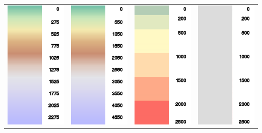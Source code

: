 \begin{longtable}{c c c c}
\includegraphics[angle=0,width=3.0cm,keepaspectratio='true']{figures/ramp-terrain-flatlands.png}&
\includegraphics[angle=0,width=3.0cm,keepaspectratio='true']{figures/ramp-terrain-mountanous.png}&
\includegraphics[angle=0,width=3.0cm,keepaspectratio='true']{figures/ramp-terrain-icao.png}&
\includegraphics[angle=0,width=3.0cm,keepaspectratio='true']{figures/ramp-terrain-grey.png}
\end{longtable}

